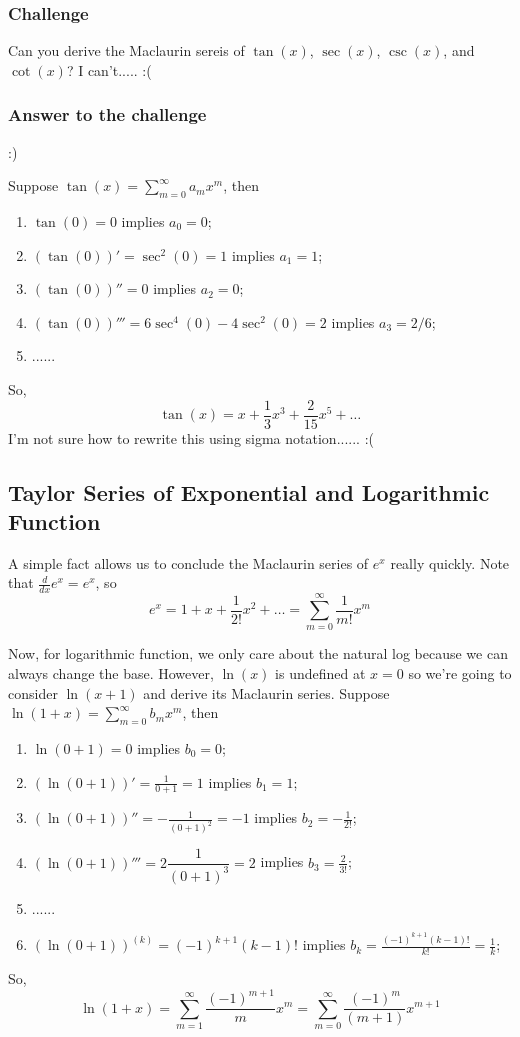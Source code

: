 \documentclass{article}
\theoremstyle{definition}
\theoremstyle{definition}
\theoremstyle{definition}
\theoremstyle{definition}
\theoremstyle{definition}
\theoremstyle{definition}
\theoremstyle{definition}
\theoremstyle{definition}
\theoremstyle{definition}
\begin{document}
\subsubsection{Challenge}
Can you derive the Maclaurin sereis of $\tan(x)$, $\sec(x)$, $\csc(x)$, and $\cot(x)$? I can't..... :(

\subsubsection{Answer to the challenge}
:) 

Suppose $\tan(x)=\sum_{m=0}^\infty a_mx^m$, then
\begin{enumerate}
    \item $\tan(0)=0$ implies $a_0=0$;
    \item $(\tan(0))'=\sec^2(0)=1$ implies $a_1=1$;
    \item $(\tan(0))''=0$ implies $a_2=0$;
    \item $(\tan(0))'''=6\sec^4(0)-4\sec^2(0)=2$ implies $a_3=2/6$;
    \item ......
\end{enumerate}
So, 
\[
\tan(x)=x+\dfrac{1}{3}x^3+\dfrac{2}{15}x^5+\ldots
\]
I'm not sure how to rewrite this using sigma notation...... :(

\subsection{Taylor Series of Exponential and Logarithmic Function}
A simple fact allows us to conclude the Maclaurin series of $e^x$ really quickly. Note that $\frac{d}{dx}e^x=e^x$, so
\[
e^x=1+x+\dfrac{1}{2!}x^2+\ldots=\sum_{m=0}^\infty\dfrac{1}{m!}x^m
\]

Now, for logarithmic function, we only care about the natural log because we can always change the base. However, $\ln(x)$ is undefined at $x=0$ so we're going to consider $\ln(x+1)$ and derive its Maclaurin series. Suppose $\ln(1+x)=\sum_{m=0}^\infty b_mx^m$, then
\begin{enumerate}
    \item $\ln(0+1)=0$ implies $b_0=0$;
    \item $(\ln(0+1))'=\frac{1}{0+1}=1$ implies $b_1=1$;
    \item $(\ln(0+1))''=-\frac{1}{(0+1)^2}=-1$ implies $b_2=-\frac{1}{2!}$;
    \item $(\ln(0+1))'''=2\dfrac{1}{(0+1)^3}=2$ implies $b_3=\frac{2}{3!}$;
    \item ......
    \item $(\ln(0+1))^{(k)}=(-1)^{k+1}(k-1)!$ implies $b_k=\frac{(-1)^{k+1}(k-1)!}{k!}=\frac{1}{k}$;
\end{enumerate}
So,
\[
\ln(1+x)=\sum_{m=1}^\infty\dfrac{(-1)^{m+1}}{m}x^m=\sum_{m=0}^\infty\dfrac{(-1)^m}{(m+1)}x^{m+1}
\]
\end{document}

